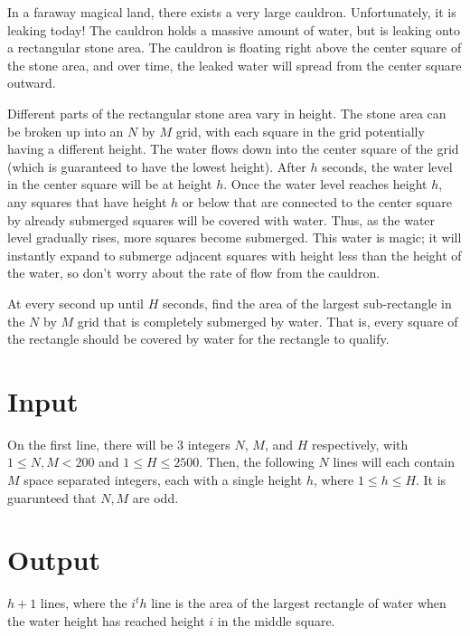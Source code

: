 
In a faraway magical land, there exists a very large cauldron. Unfortunately, it is leaking today!
The cauldron holds a massive amount of water, but is leaking onto a rectangular stone area.
The cauldron is floating right above the center square of the stone area, and over time, the leaked water
will spread from the center square outward.

Different parts of the rectangular stone area vary in height. The stone area can be broken up into an $N$
by $M$ grid, with each square in the grid potentially having a different height. The water flows down into
the center square of the grid (which is guaranteed to have the lowest height). After $h$ seconds, the water
level in the center square will be at height $h$. Once the water level reaches height $h$, any squares that
have height $h$ or below that are connected to the center square by already submerged squares will be
covered with water. Thus, as the water level gradually rises, more squares become submerged. This water is
magic; it will instantly expand to submerge adjacent squares with height less than the height of the water,
so don't worry about the rate of flow from the cauldron.

At every second up until $H$ seconds, find the area of the largest sub-rectangle in the $N$ by $M$ grid that 
is completely submerged by water. That is, every square of the rectangle should be covered by water for the
rectangle to qualify.

\section*{Input}
On the first line, there will be 3 integers $N$, $M$, and $H$ respectively, with $1 \le N, M < 200$ and $1 \le H \le 2500$. Then, the following $N$ lines will each contain $M$ space separated integers, each with a single height $h$, where $1 \le h \le H$. It is guarunteed that $N, M$ are odd.

\section*{Output}
$h + 1$ lines, where the $i^th$ line is the area of the largest rectangle of water when the water height has reached height $i$ in the middle square. 
